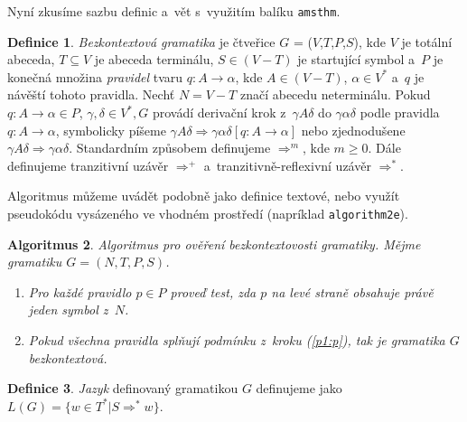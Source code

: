 \documentclass[11pt, titlepage, a4paper, twocolumn]{article}
\theoremstyle{definition}
\newtheorem{definition}{Definice}[section]
\newtheorem{algorithm}[definition]{Algoritmus}
\theoremstyle{plain}
\begin{document}
        Nyní zkusíme sazbu definic a~vět s~využitím balíku \texttt{amsthm}.
    \par
    \begin{definition} \label{d1:definice_jedna}
        \emph{Bezkontextová gramatika} je čtveřice $G$ = ($V$,$T$,$P$,$S$), kde $V$ je totální abeceda,
        $T \subseteq V$ je abeceda terminálu, $S \in  (V - T)$ je startující symbol a~$P$ je konečná množina
        \emph{pravidel} tvaru $q: A \rightarrow \alpha$, kde $A \in (V - T)$, $\alpha \in V^*$ a~$q$ je návěští
        tohoto pravidla. Nechť $N = V - T$ značí abecedu neterminálu. Pokud $q: A \rightarrow \alpha \in P$,
        $\gamma, \delta \in V^*, G$ provádí derivační krok z~$\gamma A \delta$ do $\gamma \alpha \delta$ podle
        pravidla $q: A \rightarrow \alpha$, symbolicky píšeme $\gamma A \delta \Rightarrow \gamma \alpha \delta
        \left[q: A \rightarrow \alpha \right]$ nebo zjednodušene $\gamma A \delta \Rightarrow \gamma \alpha
        \delta$. Standardním způsobem definujeme $\Rightarrow ^m$, kde $m \geq 0$. Dále definujeme
        tranzitivní uzávěr $\Rightarrow ^+$ a~tranzitivně-reflexivní uzávěr $\Rightarrow ^*$.
    \end{definition}

    Algoritmus můžeme uvádět podobně jako definice textové, nebo využít pseudokódu vysázeného ve vhodném
    prostředí (napríklad \texttt{algorithm2e}).

    \begin{algorithm}
        \emph{Algoritmus pro ověření bezkontextovosti gramatiky. Mějme gramatiku $G = (N, T, P, S)$.}
        \begin{enumerate}[\itshape 1.]
        \item \label{p1:p} \emph{Pro každé pravidlo $p \in P$ proveď test, zda $p$ na levé straně obsahuje právě
        jeden symbol z~$N$.}
        \item \emph{Pokud všechna pravidla splňují podmínku z~kroku (\ref{p1:p}), tak je gramatika $G$
        bezkontextová.}
        \end{enumerate}
    \end{algorithm}
    \begin{definition}
        \emph{Jazyk} definovaný gramatikou $G$ definujeme jako $L(G) = \{w \in T^* | S \Rightarrow^* w\}$.
    \end{definition}
\end{document}

